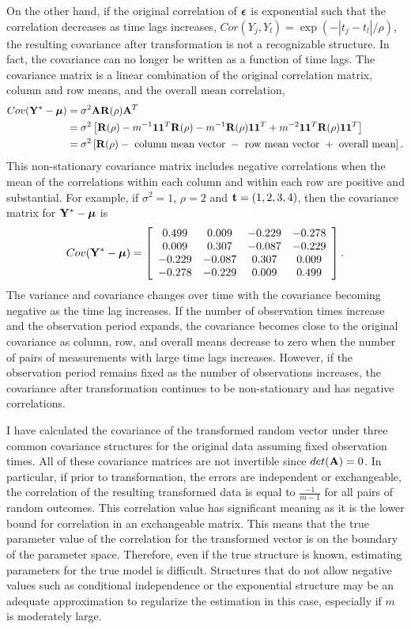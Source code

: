  On the other hand, if the original correlation of $\boldsymbol\epsilon$ is exponential such that the correlation decreases as time lags increases, $Cor(Y_{j},Y_{l}) = \exp(-|t_{j}-t_{l}|/\rho)$, the resulting covariance after transformation is not a recognizable structure. In fact, the covariance can no longer be written as a function of time lags. The covariance matrix is a linear combination of the original correlation matrix, column and row means, and the overall mean correlation,
   \begin{align*}
 Cov(\mathbf Y^{*}- \boldsymbol\mu) &= \sigma^{2}\mathbf A\mathbf R(\rho)\mathbf A^{T}\\
 &= \sigma^{2}\left[\mathbf R(\rho)-m^{-1}\mathbf1\mathbf1^{T}\mathbf R(\rho)-m^{-1}\mathbf R(\rho)\mathbf1\mathbf1^{T} + m^{-2}\mathbf1\mathbf1^{T}\mathbf R(\rho)\mathbf1\mathbf1^{T}\right]\\
  &= \sigma^{2}\left[\mathbf R(\rho)-\text{ column mean vector }-\text{ row mean vector } + \text{ overall mean}\right].
 \end{align*} 
 This non-stationary covariance matrix includes negative correlations when the mean of the correlations within each column and within each row are positive and substantial. For example, if $\sigma^{2}=1$, $\rho = 2$ and $\mathbf t=(1,2,3,4)$, then the covariance matrix for $\mathbf Y^{*}-\boldsymbol\mu$ is
$$ Cov(\mathbf Y^{*}- \boldsymbol\mu) = \left[ \begin{array}{cccc}
 0.499&  0.009& -0.229& -0.278\\
  0.009&  0.307& -0.087& -0.229\\
 -0.229& -0.087&  0.307&  0.009\\
 -0.278& -0.229&  0.009&  0.499
\end{array}\right].$$
The variance and covariance changes over time with the covariance becoming negative as the time lag increases.  If the number of observation times increase and the observation period expands, the covariance becomes close to the original covariance as column, row, and overall means decrease to zero when the number of pairs of measurements with large time lags increases. However, if the observation period remains fixed as the number of observations increases, the covariance after transformation continues to be non-stationary and has negative correlations.  

I have calculated the covariance of the transformed random vector under three common covariance structures for the original data assuming fixed observation times. All of these covariance matrices are not invertible since $det(\mathbf A) = 0$. In particular, if prior to transformation, the errors are independent or exchangeable, the correlation of the resulting transformed data is equal to $\frac{-1}{m-1}$ for all pairs of random outcomes. This correlation value has significant meaning as it is the lower bound for correlation in an exchangeable matrix. This means that the true parameter value of the correlation for the transformed vector is on the boundary of the parameter space. Therefore, even if the true structure is known, estimating parameters for the true model is difficult. Structures that do not allow negative values such as conditional independence or the exponential structure may be an adequate approximation to regularize the estimation in this case, especially if $m$ is moderately large.

